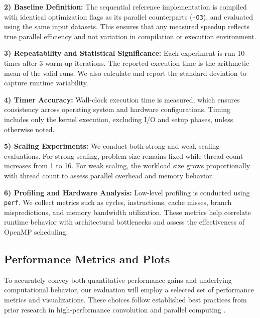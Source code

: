 \documentclass[conference, 10pt]{IEEEtran}
\begin{document}
\vspace{0.5em}
\textbf{2) Baseline Definition:} The sequential reference implementation is compiled with identical optimization flags as its parallel counterparts (\texttt{-O3}), and evaluated using the same input datasets. This ensures that any measured speedup reflects true parallel efficiency and not variation in compilation or execution environment.

\vspace{0.5em}
\textbf{3) Repeatability and Statistical Significance:} Each experiment is run 10 times after 3 warm-up iterations. The reported execution time is the arithmetic mean of the valid runs. We also calculate and report the standard deviation to capture runtime variability.

\vspace{0.5em}
\textbf{4) Timer Accuracy:} Wall-clock execution time is measured, which ensures consistency across operating system and hardware configurations. Timing includes only the kernel execution, excluding I/O and setup phases, unless otherwise noted.

\vspace{0.5em}
\textbf{5) Scaling Experiments:} We conduct both strong and weak scaling evaluations. For strong scaling, problem size remains fixed while thread count increases from 1 to 16. For weak scaling, the workload size grows proportionally with thread count to assess parallel overhead and memory behavior.

\vspace{0.5em}
\textbf{6) Profiling and Hardware Analysis:} Low-level profiling is conducted using \texttt{perf}. We collect metrics such as cycles, instructions, cache misses, branch mispredictions, and memory bandwidth utilization. These metrics help correlate runtime behavior with architectural bottlenecks and assess the effectiveness of OpenMP scheduling.


\subsection{Performance Metrics and Plots}

To accurately convey both quantitative performance gains and underlying computational behavior, our evaluation will employ a selected set of performance metrics and visualizations. These choices follow established best practices from prior research in high-performance convolution and parallel computing \cite{williams2009roofline, hager2011hpc, bhattacharjee2020analyzing, chen2021benchmarking, imran2022openmp}.
\end{document}
